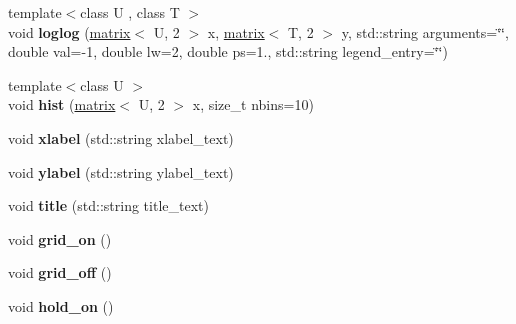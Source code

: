 \begin{DoxyCompactItemize}
\item 
\hypertarget{classkeycpp_1_1_figure_a0aa8afafd51934bee1b8885dc4492685}{{\footnotesize template$<$class U , class T $>$ }\\void {\bfseries loglog} (\hyperlink{classkeycpp_1_1matrix}{matrix}$<$ U, 2 $>$ x, \hyperlink{classkeycpp_1_1matrix}{matrix}$<$ T, 2 $>$ y, std\-::string arguments=\char`\"{}\char`\"{}, double val=-\/1, double lw=2, double ps=1., std\-::string legend\-\_\-entry=\char`\"{}\char`\"{})}\label{classkeycpp_1_1_figure_a0aa8afafd51934bee1b8885dc4492685}

\item 
\hypertarget{classkeycpp_1_1_figure_a0c3bb553a7dd49b8a78a3d9736ba9497}{{\footnotesize template$<$class U $>$ }\\void {\bfseries hist} (\hyperlink{classkeycpp_1_1matrix}{matrix}$<$ U, 2 $>$ x, size\-\_\-t nbins=10)}\label{classkeycpp_1_1_figure_a0c3bb553a7dd49b8a78a3d9736ba9497}

\item 
\hypertarget{classkeycpp_1_1_figure_addd610a718f021f3e6c7c94f9bc7f285}{void {\bfseries xlabel} (std\-::string xlabel\-\_\-text)}\label{classkeycpp_1_1_figure_addd610a718f021f3e6c7c94f9bc7f285}

\item 
\hypertarget{classkeycpp_1_1_figure_aa965967db2165b001860f75fc22c9f28}{void {\bfseries ylabel} (std\-::string ylabel\-\_\-text)}\label{classkeycpp_1_1_figure_aa965967db2165b001860f75fc22c9f28}

\item 
\hypertarget{classkeycpp_1_1_figure_a922bd966ed40095f0ae7fa184f9d0ada}{void {\bfseries title} (std\-::string title\-\_\-text)}\label{classkeycpp_1_1_figure_a922bd966ed40095f0ae7fa184f9d0ada}

\item 
\hypertarget{classkeycpp_1_1_figure_a3c036559f8ad56b099ac0b44c652225d}{void {\bfseries grid\-\_\-on} ()}\label{classkeycpp_1_1_figure_a3c036559f8ad56b099ac0b44c652225d}

\item 
\hypertarget{classkeycpp_1_1_figure_a3736e01bc278c2c2b47e4ff046fdda0e}{void {\bfseries grid\-\_\-off} ()}\label{classkeycpp_1_1_figure_a3736e01bc278c2c2b47e4ff046fdda0e}

\item 
\hypertarget{classkeycpp_1_1_figure_a65b80e5b67c7bbf225e3001a538a6dad}{void {\bfseries hold\-\_\-on} ()}\label{classkeycpp_1_1_figure_a65b80e5b67c7bbf225e3001a538a6dad}


\end{DoxyCompactItemize}
